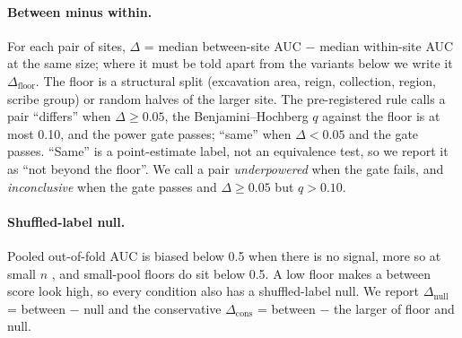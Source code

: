 \documentclass[11pt,a4paper]{article}
\begin{document}
\paragraph{Between minus within.} For each pair of sites, $\Delta$ = median between-site AUC $-$ median within-site AUC at the same size; where it must be told apart from the variants below we write it $\Delta_{\mathrm{floor}}$.
The floor is a structural split (excavation area, reign, collection, region, scribe group) or random halves of the larger site.
The pre-registered rule calls a pair ``differs'' when $\Delta \geq 0.05$, the Benjamini--Hochberg $q$ against the floor is at most 0.10, and the power gate passes; ``same'' when $\Delta < 0.05$ and the gate passes. %
``Same'' is a point-estimate label, not an equivalence test, so we report it as ``not beyond the floor''.
We call a pair \emph{underpowered} when the gate fails, and \emph{inconclusive} when the gate passes and $\Delta \geq 0.05$ but $q > 0.10$. %

\paragraph{Shuffled-label null.} Pooled out-of-fold AUC is biased below 0.5 when there is no signal, more so at small $n$ \citep{airola2011}, and small-pool floors do sit below 0.5. %
A low floor makes a between score look high, so every condition also has a shuffled-label null.
We report $\Delta_{\mathrm{null}}$ = between $-$ null and the conservative $\Delta_{\mathrm{cons}}$ = between $-$ the larger of floor and null. %
\end{document}
